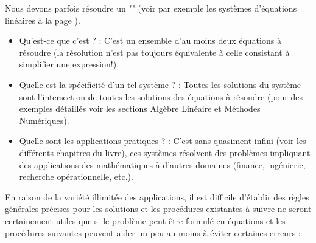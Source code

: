 	Nous devons parfois résoudre un "" (voir par exemple les systèmes d'équations linéaires à la page \pageref{linear systems of equations}).
	\begin{itemize}
		\item Qu'est-ce que c'est ? : C'est un ensemble d'au moins deux équations à résoudre (la résolution n'est pas toujours équivalente à celle consistant à simplifier une expression!).

		\item Quelle est la spécificité d'un tel système ? : Toutes les solutions du système sont l'intersection de toutes les solutions des équations à résoudre (pour des exemples détaillés voir les sections Algèbre Linéaire et Méthodes Numériques). 

		\item Quelle sont les applications pratiques ? : C'est sans quasiment infini (voir les différents chapitres du livre), ces systèmes résolvent des problèmes impliquant des applications des mathématiques à d'autres domaines (finance, ingénierie, recherche opérationnelle, etc.).
	\end{itemize}
	En raison de la variété illimitée des applications, il est difficile d'établir des règles générales précises pour les solutions et les procédures existantes à suivre ne seront certainement utiles que si le problème peut être formulé en équations et les procédures suivantes peuvent aider un peu au moins à éviter certaines erreurs :

